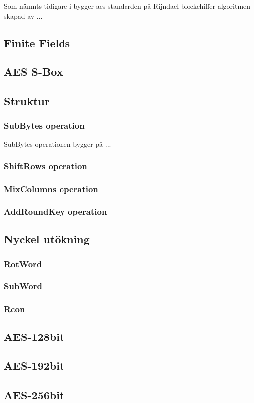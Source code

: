 Som nämnts tidigare i  bygger \acrshort{aes} standarden på Rijndael blockchiffer algoritmen
skapad av ...


\subsection{Finite Fields}


\subsection{AES S-Box}


\subsection{Struktur}


\subsubsection{SubBytes operation}
SubBytes operationen bygger på ...

\subsubsection{ShiftRows operation}


\subsubsection{MixColumns operation}


\subsubsection{AddRoundKey operation}


\subsection{Nyckel utökning}


\subsubsection{RotWord}


\subsubsection{SubWord}


\subsubsection{Rcon}


\subsection{AES-128bit}


\subsection{AES-192bit}


\subsection{AES-256bit}

